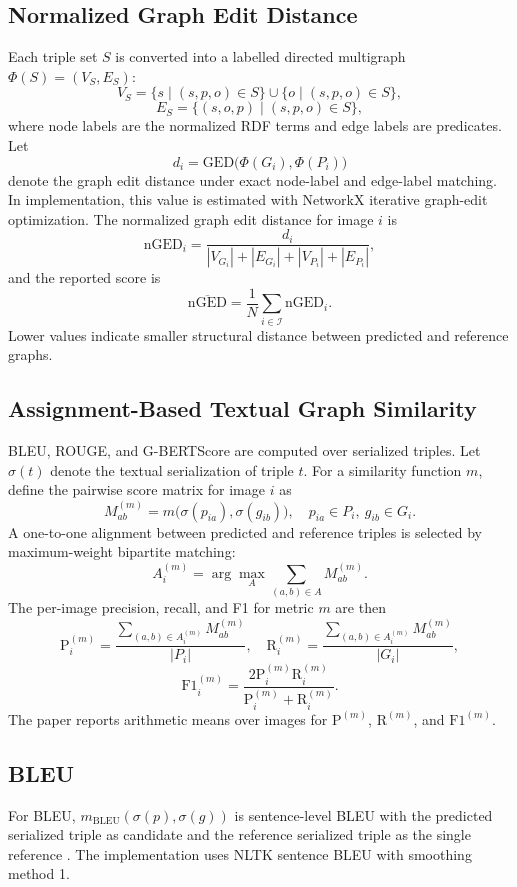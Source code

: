 \documentclass[preprint,12pt]{elsarticle}
\begin{document}
\subsection{Normalized Graph Edit Distance}
Each triple set $S$ is converted into a labelled directed multigraph $\Phi(S)=(V_S,E_S)$:
\[
V_S=\{s\mid (s,p,o)\in S\}\cup \{o\mid (s,p,o)\in S\},
\]
\[
E_S=\{(s,o,p)\mid (s,p,o)\in S\},
\]
where node labels are the normalized RDF terms and edge labels are predicates. Let
\[
d_i=\mathrm{GED}\bigl(\Phi(G_i),\Phi(P_i)\bigr)
\]
denote the graph edit distance under exact node-label and edge-label matching. In implementation, this value is estimated with NetworkX iterative graph-edit optimization. The normalized graph edit distance for image $i$ is
\[
\mathrm{nGED}_i=
\frac{d_i}
{|V_{G_i}|+|E_{G_i}|+|V_{P_i}|+|E_{P_i}|},
\]
and the reported score is
\[
\overline{\mathrm{nGED}}=\frac{1}{N}\sum_{i\in\mathcal{I}}\mathrm{nGED}_i.
\]
Lower values indicate smaller structural distance between predicted and reference graphs.

\subsection{Assignment-Based Textual Graph Similarity}
BLEU, ROUGE, and G-BERTScore are computed over serialized triples. Let $\sigma(t)$ denote the textual serialization of triple $t$. For a similarity function $m$, define the pairwise score matrix for image $i$ as
\[
M^{(m)}_{ab}=m\bigl(\sigma(p_{ia}),\sigma(g_{ib})\bigr),
\quad p_{ia}\in P_i,\ g_{ib}\in G_i .
\]
A one-to-one alignment between predicted and reference triples is selected by maximum-weight bipartite matching:
\[
A_i^{(m)}=\arg\max_{A}\sum_{(a,b)\in A}M^{(m)}_{ab}.
\]
The per-image precision, recall, and F1 for metric $m$ are then
\[
\mathrm{P}^{(m)}_i=
\frac{\sum_{(a,b)\in A_i^{(m)}}M^{(m)}_{ab}}{|P_i|},\quad
\mathrm{R}^{(m)}_i=
\frac{\sum_{(a,b)\in A_i^{(m)}}M^{(m)}_{ab}}{|G_i|},
\]
\[
\mathrm{F1}^{(m)}_i=
\frac{2\mathrm{P}^{(m)}_i\mathrm{R}^{(m)}_i}
{\mathrm{P}^{(m)}_i+\mathrm{R}^{(m)}_i}.
\]
The paper reports arithmetic means over images for $\mathrm{P}^{(m)}$, $\mathrm{R}^{(m)}$, and $\mathrm{F1}^{(m)}$.

\subsection{BLEU}
For BLEU, $m_{\mathrm{BLEU}}(\sigma(p),\sigma(g))$ is sentence-level BLEU with the predicted serialized triple as candidate and the reference serialized triple as the single reference \citep{bleu}. The implementation uses NLTK sentence BLEU with smoothing method 1.
\end{document}
